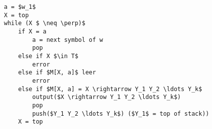\documentclass[
	border=0.2cm,
	convert={density=600}
]{standalone}
\begin{document}
\begin{lstlisting}[mathescape,basicstyle=\scriptsize\ttfamily]
a = $w_1$
X = top
while (X $ \neq \perp)$
    if X = a
        a = next symbol of w
        pop
    else if X $\in T$
        error
    else if $M[X, a]$ leer
        error
    else if $M[X, a] = X \rightarrow Y_1 Y_2 \ldots Y_k$
        output($X \rightarrow Y_1 Y_2 \ldots Y_k$)
        pop
        push($Y_1 Y_2 \ldots Y_k$) ($Y_1$ = top of stack))
    X = top
\end{lstlisting}
\end{document}
